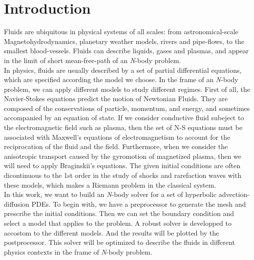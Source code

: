 \section{Introduction}

Fluids are ubiquitous in physical systems of all scales: from astronomical-scale
Magnetohydrodynamics, planetary weather models, rivers and pipe-flows, to the smallest
blood-vessels. Fluids can describe liquids, gases and plasmas, and appear in the limit
of short mean-free-path of an \textit{N}-body problem.\\

In physics, fluids are usually described by a set of partial differential equations,
which are specified according the model we choose. In the frame of an \textit{N}-body
problem, we can apply different models to study different regimes. First of all, the
Navier-Stokes equations predict the motion of Newtonian Fluids. They are composed of
the conservations of particle, momentum, and energy, and sometimes accompanied by an
equation of state. If we consider conductive fluid subeject to the electromagnetic
field such as plasma, then the set of N-S equations must be associated with Maxwell's
equations of electromagnetism to account for the reciprocation of the fluid and the
field. Furthermore, when we consider the anisotropic transport caused by the gyromotion
of magnetized plasma, then we will need to apply Braginskii's equations. The given
initial conditions are often dicontinuous to the 1st order in the study of shocks and
rarefaction waves with these models, which makes a Riemann problem in the classical
system.\\

In this work, we want to build an \textit{N}-body solver for a set of hyperbolic
advection-diffusion PDEs. To begin with, we have a preprocessor to generate the mesh
and prescribe the initial conditions. Then we can set the boundary condition and select
a model that applies to the problem. A robust solver is developped to accostom to the
different models. And the results will be plotted by the postprocessor. This solver
will be optimized to describe the fluids in different physics contexts in the frame of
\textit{N}-body problem.\\
